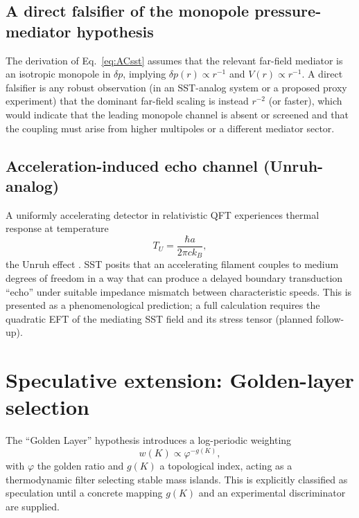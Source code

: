 \documentclass[pdflatex,sn-mathphys-num]{revtex4-2}
\begin{document}
    \subsection{A direct falsifier of the monopole pressure-mediator hypothesis}
        The derivation of Eq.~\eqref{eq:ACsst} assumes that the relevant far-field mediator is an isotropic monopole in
        \(\delta p\), implying \(\delta p(r)\propto r^{-1}\) and \(V(r)\propto r^{-1}\).
        A direct falsifier is any robust observation (in an SST-analog system or a proposed proxy experiment) that the
        dominant far-field scaling is instead \(r^{-2}\) (or faster), which would indicate that the leading monopole channel
        is absent or screened and that the coupling must arise from higher multipoles or a different mediator sector.

    \subsection{Acceleration-induced echo channel (Unruh-analog)}
        A uniformly accelerating detector in relativistic QFT experiences thermal response at temperature
        \begin{equation}
            T_U = \frac{\hbar a}{2\pi c k_B},
        \end{equation}
        the Unruh effect \cite{Unruh1976}.
        SST posits that an accelerating filament couples to medium degrees of freedom in a way that can produce a delayed boundary
        transduction ``echo'' under suitable impedance mismatch between characteristic speeds.
        This is presented as a phenomenological prediction; a full calculation requires the quadratic EFT of the mediating SST field
        and its stress tensor (planned follow-up).

    \section{Speculative extension: Golden-layer selection}
    The ``Golden Layer'' hypothesis introduces a log-periodic weighting
    \[
        w(K)\propto \varphi^{-g(K)},
    \]
    with \(\varphi\) the golden ratio and \(g(K)\) a topological index, acting as a thermodynamic filter selecting
    stable mass islands. This is explicitly classified as speculation until a concrete mapping \(g(K)\) and an experimental discriminator are supplied.

\end{document}
